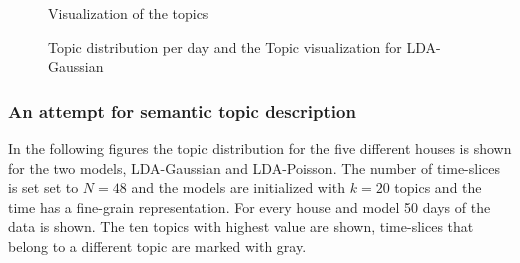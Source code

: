 \begin{figure}
\begin{minipage}[b]{0.45\linewidth}
  \caption{Visualization of the topics}
  \label{fig:GausTopVisu96}
 \end{minipage}
 \caption{Topic distribution per day and the Topic visualization for LDA-Gaussian}
 \label{fig:Gaus96}
\end{figure}

\subsubsection{An attempt for semantic topic description}
In the following figures the topic distribution for the five different houses is shown for the two models, LDA-Gaussian and LDA-Poisson. The number of time-slices is set set to $N=48$ and the models are initialized with $k=20$ topics and the time has a fine-grain representation. For every house and model 50 days of the data is shown. The ten topics with highest value are shown, time-slices that belong to a different topic are marked with gray.

